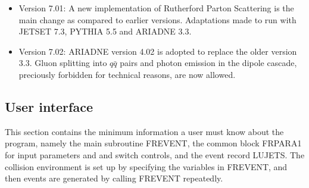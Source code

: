 \begin{itemize}
\item{Version 7.01: A new implementation of Rutherford Parton Scattering is the
 main change as compared to earlier versions.  Adaptations made to run with
 JETSET 7.3, PYTHIA 5.5 and ARIADNE 3.3.   
 }
\item{Version 7.02: ARIADNE version 4.02 is adopted to replace the older version
 3.3.  Gluon splitting into $q\bar q$ pairs and photon emission
 in the dipole cascade, preciously
 forbidden for technical reasons, are now allowed.
 }

\end{itemize}

\subsection{User interface}

This section contains the minimum information a user must know about the program,
namely the main subroutine FREVENT, the common block FRPARA1 for 
input parameters and and switch controls, 
and the event record LUJETS.  The collision
environment is set up by specifying the variables in FREVENT, and then events
are generated by calling FREVENT repeatedly.  

